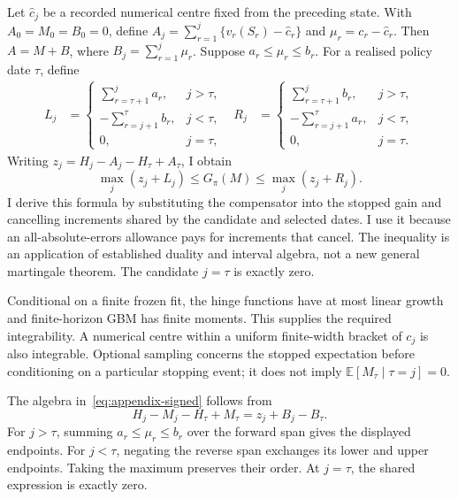 \documentclass[11pt]{article}
\newcommand{\E}{\mathbb E}
\begin{document}
Let $\widehat c_j$ be a recorded numerical centre fixed from the preceding state. With $A_0=M_0=B_0=0$, define $A_j=\sum_{r=1}^j\{v_r(S_r)-\widehat c_r\}$ and $\mu_r=c_r-\widehat c_r$. Then $A=M+B$, where $B_j=\sum_{r=1}^j\mu_r$. Suppose $a_r\leq\mu_r\leq b_r$. For a realised policy date $\tau$, define
\begin{align}
 L_j&=\begin{cases}
 \sum_{r=\tau+1}^j a_r,&j>\tau,\\
 -\sum_{r=j+1}^{\tau}b_r,&j<\tau,\\0,&j=\tau,
 \end{cases} &
 R_j&=\begin{cases}
 \sum_{r=\tau+1}^j b_r,&j>\tau,\\
 -\sum_{r=j+1}^{\tau}a_r,&j<\tau,\\0,&j=\tau.
 \end{cases}
\end{align}
Writing $z_j=H_j-A_j-H_\tau+A_\tau$, I obtain
\begin{equation}
 \max_j(z_j+L_j)\leq G_\pi(M)\leq\max_j(z_j+R_j).
\label{eq:appendix-signed}
\end{equation}
I derive this formula by substituting the compensator into the stopped gain and cancelling increments shared by the candidate and selected dates. I use it because an all-absolute-errors allowance pays for increments that cancel. The inequality is an application of established duality and interval algebra, not a new general martingale theorem. The candidate $j=\tau$ is exactly zero.

Conditional on a finite frozen fit, the hinge functions have at most linear growth and finite-horizon GBM has finite moments. This supplies the required integrability. A numerical centre within a uniform finite-width bracket of $c_j$ is also integrable. Optional sampling concerns the stopped expectation before conditioning on a particular stopping event; it does not imply $\E[M_\tau\mid\tau=j]=0$.

The algebra in~\eqref{eq:appendix-signed} follows from
\begin{equation}
 H_j-M_j-H_\tau+M_\tau=z_j+B_j-B_\tau.
\label{eq:compensator-substitution}
\end{equation}
For $j>\tau$, summing $a_r\leq\mu_r\leq b_r$ over the forward span gives the displayed endpoints. For $j<\tau$, negating the reverse span exchanges its lower and upper endpoints. Taking the maximum preserves their order. At $j=\tau$, the shared expression is exactly zero.
\end{document}
